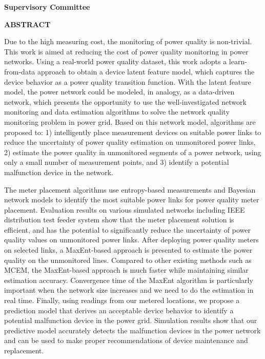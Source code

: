 \newpage
{}

\noindent \textbf{Supervisory Committee}
\tpbreak
\panel

\begin{center}
\textbf{ABSTRACT}
\end{center}

Due to the high measuring cost, the monitoring of power quality is non-trivial. This work is aimed at reducing the cost of power quality monitoring in power networks. Using a real-world power quality dataset, this work adopts a learn-from-data approach to obtain a device latent feature model, which captures the device behavior as a power quality transition function. With the latent feature model, the power network could be modeled, in analogy, as a data-driven network, which presents the opportunity to use the well-investigated network monitoring and data estimation algorithms to solve the network quality monitoring problem in power grid. Based on this network model, algorithms are proposed to: 1) intelligently place measurement devices on suitable power links to reduce the uncertainty of power quality estimation on unmonitored power links, 2) estimate the power quality in unmonitored segments of a power network, using only a small number of measurement points, and 3) identify a potential malfunction device in the network.

The meter placement algorithms use entropy-based measurements and Bayesian network models to identify the most suitable power links for power quality meter placement. Evaluation results on various simulated networks including IEEE distribution test feeder system show that the meter placement solution is efficient, and has the potential to significantly reduce the uncertainty of power quality values on unmonitored power links. After deploying power quality meters on selected links, a MaxEnt-based approach is presented to estimate the power quality on the unmonitored lines. Compared to other existing methods such as MCEM, the MaxEnt-based approach is much faster while maintaining similar estimation accuracy. Convergence time of the MaxEnt algorithm is particularly important when the network size increases and we need to do the estimation in real time. Finally, using readings from our metered locations, we propose a prediction model that derives an acceptable device behavior to identify a potential malfunction device in the power grid. Simulation results show that our predictive model accurately detects the malfunction devices in the power network and can be used to make proper recommendations of device maintenance and replacement.